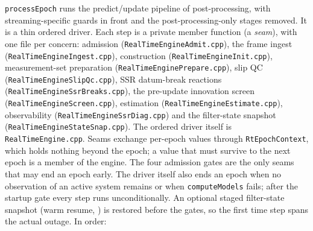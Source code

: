 \documentclass[main.tex]{subfiles}
\begin{document}
\texttt{processEpoch} runs the predict/update pipeline of
post-processing, with streaming-specific guards in front and the
post-processing-only stages removed.  It is a thin ordered driver.  Each
step is a private member function (a \emph{seam}), with one file per
concern: admission (\texttt{RealTimeEngineAdmit.cpp}), the frame ingest
(\texttt{RealTimeEngineIngest.cpp}), construction
(\texttt{RealTimeEngineInit.cpp}), measurement-set
preparation (\texttt{RealTimeEnginePrepare.cpp}), slip QC
(\texttt{RealTimeEngineSlipQc.cpp}), SSR datum-break reactions
(\texttt{RealTimeEngineSsrBreaks.cpp}), the pre-update innovation screen
(\texttt{RealTimeEngineScreen.cpp}), estimation
(\texttt{RealTimeEngineEstimate.cpp}), observability
(\texttt{RealTimeEngineSsrDiag.cpp}) and the filter-state snapshot
(\texttt{RealTimeEngineStateSnap.cpp}).  The ordered driver itself is
\texttt{RealTimeEngine.cpp}.  Seams exchange per-epoch values
through \texttt{RtEpochContext}, which holds nothing beyond the epoch; a
value that must survive to the next epoch is a member of the engine.
The four admission gates are the only seams that may end an epoch early.
The driver itself also ends an epoch when no observation of an active
system remains or when \texttt{computeModels} fails; after the startup
gate every step runs unconditionally.  An optional staged filter-state
snapshot (warm resume, ) is restored before the gates, so the first time
step spans the actual outage.  In order:
\end{document}
